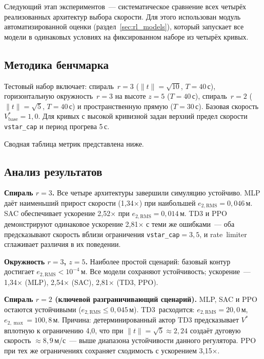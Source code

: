 Следующий этап экспериментов~--- систематическое сравнение всех четырёх реализованных архитектур выбора скорости. Для этого использован модуль автоматизированной оценки (раздел~\ref{sec:rl_models}), который запускает все модели в одинаковых условиях на фиксированном наборе из четырёх кривых.

\subsection*{Методика бенчмарка}

Тестовый набор включает: спираль~$r{=}3$ ($\|t\|{=}\sqrt{10}$, $T{=}40$\,с), горизонтальную окружность~$r{=}3$ на высоте $z{=}5$ ($T{=}40$\,с), спираль~$r{=}2$ ($\|t\|{=}\sqrt{5}$, $T{=}40$\,с) и пространственную прямую ($T{=}30$\,с). Базовая скорость $V^{\ast}_{\mathrm{base}}{=}1{,}0$. Для кривых с высокой кривизной задан верхний предел скорости \texttt{vstar\_cap} и период прогрева 5\,с.

Сводная таблица метрик представлена ниже.



\FloatBarrier

\subsection*{Анализ результатов}

\textbf{Спираль $r{=}3$.}
Все четыре архитектуры завершили симуляцию устойчиво. MLP даёт наименьший прирост скорости (1{,}34×) при наибольшей $e_{2,\mathrm{RMS}}{=}0{,}046$\,м. SAC обеспечивает ускорение 2{,}52× при $e_{2,\mathrm{RMS}}{=}0{,}014$\,м. TD3 и PPO демонстрируют одинаковое ускорение 2{,}81× с теми же ошибками~--- оба предсказывают скорость вблизи ограничения \texttt{vstar\_cap}$=3{,}5$, и rate~limiter сглаживает различия в их поведении.

\textbf{Окружность $r{=}3$, $z{=}5$.}
Наиболее простой сценарий: базовый контур достигает $e_{2,\mathrm{RMS}} < 10^{-4}$\,м. Все модели сохраняют устойчивость; ускорение~--- 1{,}34× (MLP), 2{,}54× (SAC), 2{,}81× (TD3, PPO).

\textbf{Спираль $r{=}2$ (ключевой разграничивающий сценарий).}
MLP, SAC и PPO остаются устойчивыми ($e_{2,\mathrm{RMS}} \leq 0{,}045$\,м). TD3~расходится: $e_{2,\mathrm{RMS}}{=}20{,}0$\,м, $e_{2,\max}{=}100{,}8$\,м. Причина: детерминированный актор TD3 предсказывает $V^{\ast}$ вплотную к ограничению 4{,}0, что при $\|t\|{=}\sqrt{5}\approx2{,}24$ создаёт дуговую скорость $\approx8{,}9$\,м/с~--- выше диапазона устойчивости данного регулятора. PPO при тех же ограничениях сохраняет сходимость с ускорением 3{,}15×.

